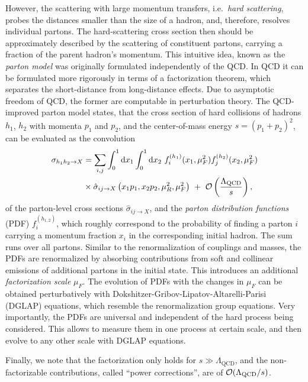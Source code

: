 However, the scattering with large momentum transfers, i.e.\ \emph{hard scattering}, 
probes the distances smaller than the size of a hadron, and, therefore, resolves individual partons.
The hard-scattering cross section then should be approximately described by the scattering of constituent partons, carrying a fraction of
the parent hadron's momentum.
This intuitive idea, known as the \emph{parton model} \cite{Feynman1969} was originally formulated independently of the QCD.
In QCD it can be formulated more rigorously in terms of a factorization theorem,
which separates the short-distance from long-distance effects.
Due to asymptotic freedom of QCD, the former are computable in perturbation theory.
The QCD-improved parton model states, that the cross section of hard collisions of hadrons $h_1$, $h_2$ with momenta $p_1$ and $p_2$,
and the center-of-mass energy $s=(p_1+p_2)^2$,
can be evaluated as the convolution
\begin{align}
\label{eq:factorization}\notag
  \sigma_{h_1 h_2 \to  X} &= \sum_{i,j}\int_0^1\dd x_1 \int_0^1 \dd x_2 ~ f_{i}^{(h_1)}(x_1,\mu_F^2)f_{j}^{(h_2)}(x_2,\mu_F^2) \\ 
 & \times
  \hat \sigma_{ij\rightarrow X}\left(x_1 p_1,x_2 p_2,\mu_R^2,{\mu_F^2}\right) 
  ~+~\mathcal{O}\left(\frac{\Lambda_\text{QCD} }{s}\right),
\end{align}
of the parton-level cross sections $\hat \sigma_{ij\rightarrow X}$, and the \emph{parton distribution functions} (PDF) $f_i^{(h_{1,2})}$,
which roughly correspond to the probability of finding a parton $i$ carrying a momentum fraction $x_i$ in the corresponding initial hadron.
The sum runs over all partons.
Similar to the renormalization of couplings and masses, the PDFs are renormalized by
absorbing contributions from soft and collinear emissions of additional partons in the initial state.
This introduces an additional \emph{factorization scale}  $\mu_F$.
The evolution of PDFs with the changes in $\mu_F$ can be obtained perturbatively 
with Dokshitzer-Gribov-Lipatov-Altarelli-Parisi
\cite{Dokshitzer:1977sg,Gribov:1972ri,Altarelli:1977zs} (DGLAP)
equations, which resemble the renormalization group equations.
Very importantly, the PDFs are universal and independent of the hard process being considered.
This allows to measure them in one process at certain scale, and then evolve to any other scale with DGLAP equations.

Finally, we note that the factorization only holds for $s \gg \Lambda_\text{QCD} $, and
the non-factorizable contributions, called ``power corrections'', are of $\order{\Lambda_\text{QCD}/s}$.

